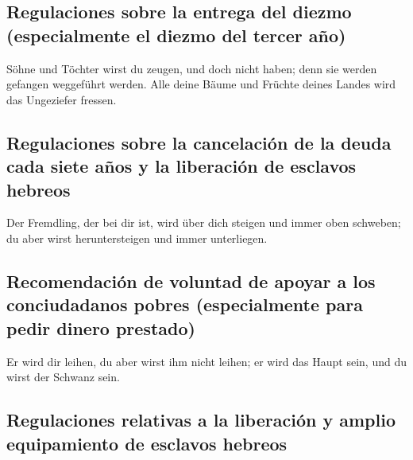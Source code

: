 \hypertarget{regulaciones-sobre-la-entrega-del-diezmo-especialmente-el-diezmo-del-tercer-auxf1o}{%
\subsection{Regulaciones sobre la entrega del diezmo (especialmente el
diezmo del tercer
año)}\label{regulaciones-sobre-la-entrega-del-diezmo-especialmente-el-diezmo-del-tercer-auxf1o}}

 Söhne und Töchter wirst du zeugen, und doch nicht haben;
denn sie werden gefangen weggeführt werden.  Alle deine
Bäume und Früchte deines Landes wird das Ungeziefer fressen.

\hypertarget{regulaciones-sobre-la-cancelaciuxf3n-de-la-deuda-cada-siete-auxf1os-y-la-liberaciuxf3n-de-esclavos-hebreos}{%
\subsection{Regulaciones sobre la cancelación de la deuda cada siete
años y la liberación de esclavos
hebreos}\label{regulaciones-sobre-la-cancelaciuxf3n-de-la-deuda-cada-siete-auxf1os-y-la-liberaciuxf3n-de-esclavos-hebreos}}

 Der Fremdling, der bei dir ist, wird über dich steigen
und immer oben schweben; du aber wirst heruntersteigen und immer
unterliegen.

\hypertarget{recomendaciuxf3n-de-voluntad-de-apoyar-a-los-conciudadanos-pobres-especialmente-para-pedir-dinero-prestado}{%
\subsection{Recomendación de voluntad de apoyar a los conciudadanos
pobres (especialmente para pedir dinero
prestado)}\label{recomendaciuxf3n-de-voluntad-de-apoyar-a-los-conciudadanos-pobres-especialmente-para-pedir-dinero-prestado}}

 Er wird dir leihen, du aber wirst ihm nicht leihen; er
wird das Haupt sein, und du wirst der Schwanz sein.

\hypertarget{regulaciones-relativas-a-la-liberaciuxf3n-y-amplio-equipamiento-de-esclavos-hebreos}{%
\subsection{Regulaciones relativas a la liberación y amplio equipamiento
de esclavos
hebreos}\label{regulaciones-relativas-a-la-liberaciuxf3n-y-amplio-equipamiento-de-esclavos-hebreos}}

